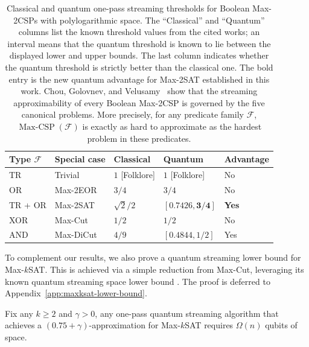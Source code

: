 \begin{table}[ht]
\centering
\small
\renewcommand{\arraystretch}{1.2}
\setlength{\tabcolsep}{5pt}
\begin{tabular}{p{}p{}p{}p{}p{}}
\toprule
Type $\mathcal{F}$
& Special case 
& Classical 
& Quantum 
& Advantage \\
\midrule
TR
& Trivial
& $1$ [Folklore]
& $1$ [Folklore]
& No \\

OR
& Max-2EOR
& $3/4$ \cite{CGV20}
& $3/4$ \cite{KP22}
& No \\

TR + OR
& Max-2SAT
& $\sqrt{2}/2$ \cite{CGV20}
& $\mathbf{[0.7426,3/4]}$ 
& \textbf{Yes}\\ 

XOR
& Max-Cut 
& $1/2$ \cite{CGV20}
& $1/2$ \cite{KP22}
& No \\ 

AND
& Max-DiCut 
& $4/9$ \cite{CGV20}
& $[0.4844,1/2]$ \cite{KPV23}
& Yes \\
\bottomrule
\end{tabular}
\caption{Classical and quantum one-pass streaming thresholds for Boolean Max-2CSPs with polylogarithmic space. The ``Classical'' and ``Quantum'' columns list the known threshold values from the cited works; an interval means that the quantum threshold is known to lie between the displayed lower and upper bounds. The last column indicates whether the quantum threshold is strictly better than the classical one. The bold entry is the new quantum advantage for Max-2SAT established in this work. Chou, Golovnev, and Velusamy~\cite{CGV20} show that the streaming approximability of every Boolean Max-2CSP is governed by the five canonical problems. More precisely, for any predicate family $\mathcal F$, $\operatorname{Max-CSP}(\mathcal F)$ is exactly as hard to approximate as the hardest problem in these predicates.}
\label{tab:max2csp-quantum-advantage}
\end{table}

To complement our results, we also prove a quantum streaming lower bound for Max-$k$SAT. This is achieved via a simple reduction from Max-Cut, leveraging its known quantum streaming space lower bound \cite{KP22}. The proof is deferred to Appendix~\ref{app:maxksat-lower-bound}.

\begin{theorem} \label{thm:maxksat-quantum-lb}
Fix any $k\ge2$ and $\gamma>0$, any one-pass quantum streaming algorithm that achieves a $(0.75+\gamma)$-approximation for Max-$k$SAT requires $\Omega(n)$ qubits of space.
\end{theorem}

